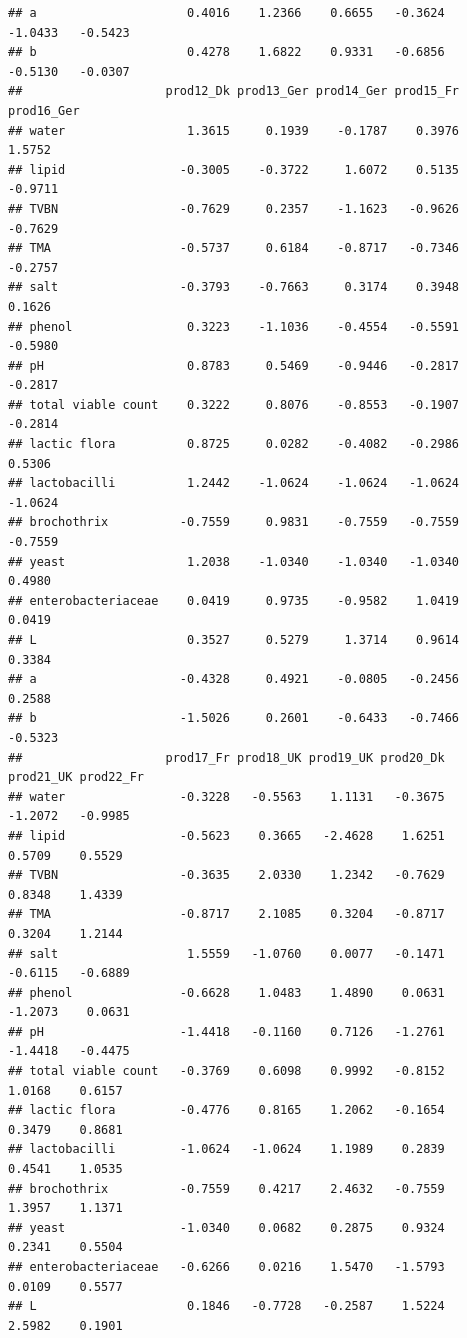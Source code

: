 \documentclass[
]{book}
\begin{document}
\begin{verbatim}
## a                     0.4016    1.2366    0.6655   -0.3624   -1.0433   -0.5423
## b                     0.4278    1.6822    0.9331   -0.6856   -0.5130   -0.0307
##                    prod12_Dk prod13_Ger prod14_Ger prod15_Fr prod16_Ger
## water                 1.3615     0.1939    -0.1787    0.3976     1.5752
## lipid                -0.3005    -0.3722     1.6072    0.5135    -0.9711
## TVBN                 -0.7629     0.2357    -1.1623   -0.9626    -0.7629
## TMA                  -0.5737     0.6184    -0.8717   -0.7346    -0.2757
## salt                 -0.3793    -0.7663     0.3174    0.3948     0.1626
## phenol                0.3223    -1.1036    -0.4554   -0.5591    -0.5980
## pH                    0.8783     0.5469    -0.9446   -0.2817    -0.2817
## total viable count    0.3222     0.8076    -0.8553   -0.1907    -0.2814
## lactic flora          0.8725     0.0282    -0.4082   -0.2986     0.5306
## lactobacilli          1.2442    -1.0624    -1.0624   -1.0624    -1.0624
## brochothrix          -0.7559     0.9831    -0.7559   -0.7559    -0.7559
## yeast                 1.2038    -1.0340    -1.0340   -1.0340     0.4980
## enterobacteriaceae    0.0419     0.9735    -0.9582    1.0419     0.0419
## L                     0.3527     0.5279     1.3714    0.9614     0.3384
## a                    -0.4328     0.4921    -0.0805   -0.2456     0.2588
## b                    -1.5026     0.2601    -0.6433   -0.7466    -0.5323
##                    prod17_Fr prod18_UK prod19_UK prod20_Dk prod21_UK prod22_Fr
## water                -0.3228   -0.5563    1.1131   -0.3675   -1.2072   -0.9985
## lipid                -0.5623    0.3665   -2.4628    1.6251    0.5709    0.5529
## TVBN                 -0.3635    2.0330    1.2342   -0.7629    0.8348    1.4339
## TMA                  -0.8717    2.1085    0.3204   -0.8717    0.3204    1.2144
## salt                  1.5559   -1.0760    0.0077   -0.1471   -0.6115   -0.6889
## phenol               -0.6628    1.0483    1.4890    0.0631   -1.2073    0.0631
## pH                   -1.4418   -0.1160    0.7126   -1.2761   -1.4418   -0.4475
## total viable count   -0.3769    0.6098    0.9992   -0.8152    1.0168    0.6157
## lactic flora         -0.4776    0.8165    1.2062   -0.1654    0.3479    0.8681
## lactobacilli         -1.0624   -1.0624    1.1989    0.2839    0.4541    1.0535
## brochothrix          -0.7559    0.4217    2.4632   -0.7559    1.3957    1.1371
## yeast                -1.0340    0.0682    0.2875    0.9324    0.2341    0.5504
## enterobacteriaceae   -0.6266    0.0216    1.5470   -1.5793    0.0109    0.5577
## L                     0.1846   -0.7728   -0.2587    1.5224    2.5982    0.1901

\end{verbatim}
\end{document}
